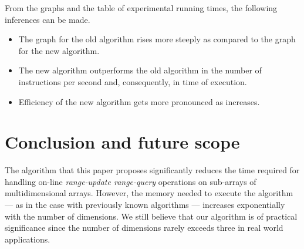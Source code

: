 \documentclass[a4paper]{article}
\begin{document}
\noindent
From the graphs and the table of experimental running times, the following inferences can be made.

\begin{itemize}
\item The graph for the old algorithm rises more steeply as compared to the graph for the new algorithm.
\item The new algorithm outperforms the old algorithm in the number of instructions per second and, consequently, in time of execution.
\item Efficiency of the new algorithm gets more pronounced as  increases.
\end{itemize}



\section{Conclusion and future scope}
The algorithm that this paper proposes significantly reduces the time required for handling on-line \textit{range-update range-query} operations on sub-arrays of multidimensional arrays. However, the memory needed to execute the algorithm --- as in the case with previously known algorithms --- increases exponentially with the number of dimensions. We still believe that our algorithm is of practical significance since the number of dimensions rarely exceeds three in real world applications.
\end{document}
